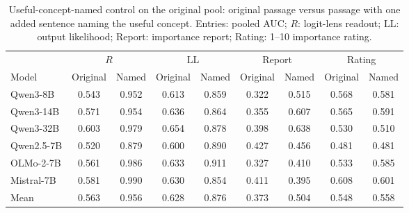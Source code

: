 \begin{table}[t]
\centering
\caption{Useful-concept-named control on the original pool: original passage versus passage with one added sentence naming the useful concept. Entries: pooled AUC; $R$:
logit-lens readout; $\mathrm{LL}$: output likelihood; Report: importance report; Rating: 1--10
importance rating.}
\label{tab:statedcontrol}
\small
\setlength{\tabcolsep}{4pt}
\begin{tabular}{lcccccccc}
\toprule
& \multicolumn{2}{c}{$R$} & \multicolumn{2}{c}{$\mathrm{LL}$} & \multicolumn{2}{c}{Report} & \multicolumn{2}{c}{Rating} \\
\cmidrule(lr){2-3}\cmidrule(lr){4-5}\cmidrule(lr){6-7}\cmidrule(lr){8-9}
Model & Original & Named & Original & Named & Original & Named & Original & Named \\
\midrule
Qwen3-8B & 0.543 & 0.952 & 0.613 & 0.859 & 0.322 & 0.515 & 0.568 & 0.581 \\
Qwen3-14B & 0.571 & 0.954 & 0.636 & 0.864 & 0.355 & 0.607 & 0.565 & 0.591 \\
Qwen3-32B & 0.603 & 0.979 & 0.654 & 0.878 & 0.398 & 0.638 & 0.530 & 0.510 \\
Qwen2.5-7B & 0.520 & 0.879 & 0.600 & 0.890 & 0.427 & 0.456 & 0.481 & 0.481 \\
OLMo-2-7B & 0.561 & 0.986 & 0.633 & 0.911 & 0.327 & 0.410 & 0.533 & 0.585 \\
Mistral-7B & 0.581 & 0.990 & 0.630 & 0.854 & 0.411 & 0.395 & 0.608 & 0.601 \\
\midrule
Mean & 0.563 & 0.956 & 0.628 & 0.876 & 0.373 & 0.504 & 0.548 & 0.558 \\
\bottomrule
\end{tabular}
\end{table}
